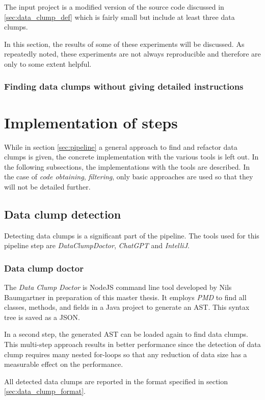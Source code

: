 The input project is a modified version of the source code discussed in \ref{sec:data_clump_def} which is fairly small but include at least three data clumps. 

In this section, the results of some of these experiments will be discussed.  As repeatedly noted, these experiments are not always reproducible and therefore are only to some extent helpful.
\subsubsection{Finding data clumps without giving detailed instructions}



\section{Implementation of steps}
While in section \ref{sec:pipeline} a general approach to find and refactor data clumps is given, the concrete implementation with the various tools is left out. In the following subsections, the implementations with the tools are described. In the case of \textit{code obtaining}, \textit{filtering}, only basic approaches are used so that they will not be detailed further. 

\subsection{Data clump detection}
Detecting data clumps is a significant part of the pipeline. The tools used for this pipeline step are \textit{DataClumpDoctor}, \textit{ChatGPT} and \textit{IntelliJ}.
\subsubsection{Data clump doctor}

The  \textit{Data Clump Doctor} is NodeJS command line tool developed by Nils Baumgartner in preparation of this master thesis. It employs \textit{PMD} to find all classes, methods, and fields in a Java project to generate an \ac{AST}. This syntax tree is saved as a \ac{JSON}. 

In a second step, the generated \ac{AST} can be loaded again to find data clumps. This multi-step approach results in better performance since the detection of data clump requires many nested for-loops so that any reduction of data size has a measurable effect on the performance.

All detected data clumps are reported in the format specified in section \ref{sec:data_clump_format}.

